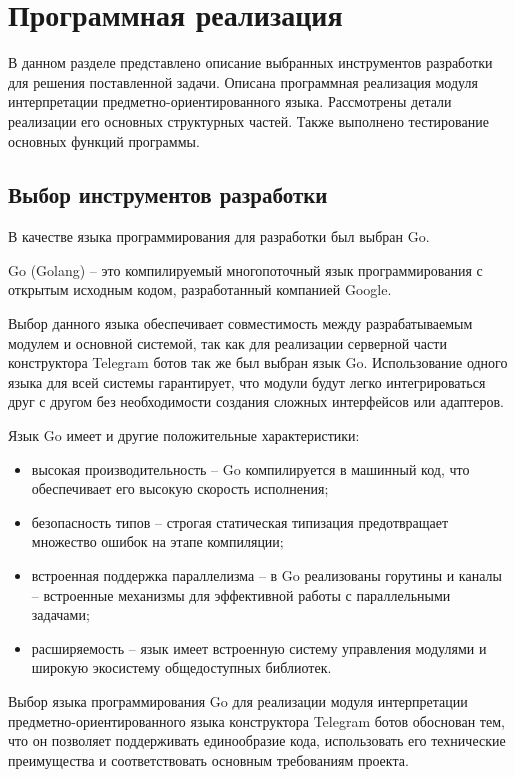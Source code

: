\newpage

\section{Программная реализация}

В данном разделе представлено описание выбранных инструментов разработки для решения поставленной задачи. 
Описана программная реализация модуля интерпретации предметно-ориентированного языка.
Рассмотрены детали реализации его основных структурных частей.
Также выполнено тестирование основных функций программы.

\subsection{Выбор инструментов разработки}

В качестве языка программирования для разработки был выбран Go.

Go (Golang) -- это компилируемый многопоточный язык программирования с открытым исходным кодом, разработанный компанией Google.

Выбор данного языка обеспечивает совместимость между разрабатываемым модулем и основной системой,
так как для реализации серверной части конструктора Telegram ботов так же был выбран язык Go.
Использование одного языка для всей системы гарантирует,
что модули будут легко интегрироваться друг с другом без необходимости создания сложных интерфейсов или адаптеров.

Язык Go имеет и другие положительные характеристики:
\begin{itemize}
    \item высокая производительность -- Go компилируется в машинный код, что обеспечивает его высокую скорость исполнения;
    \item безопасность типов -- строгая статическая типизация предотвращает множество ошибок на этапе компиляции;
    \item встроенная поддержка параллелизма -- в Go реализованы горутины и каналы -- встроенные механизмы для эффективной работы с параллельными задачами;
    \item расширяемость -- язык имеет встроенную систему управления модулями и широкую экосистему общедоступных библиотек.
\end{itemize}

Выбор языка программирования Go для реализации модуля интерпретации предметно-ориентированного языка конструктора Telegram ботов обоснован тем,
что он позволяет поддерживать единообразие кода, использовать его технические преимущества и соответствовать основным требованиям проекта.

